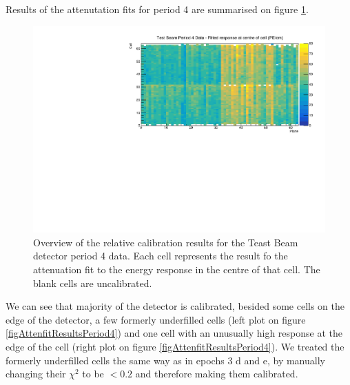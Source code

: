 \documentclass[12pt,a4paper]{article}
\begin{document}
Results of the attenutation fits for period 4 are summarised on figure \ref{figCellCentreResponsePeriod4}.

\begin{figure}[!hbtp]
\centering
\includegraphics[width=\textwidth]{Plots/CellResponseAtCentre_period4_Limited.pdf}
\caption{Overview of the relative calibration results for the Teast Beam detector period 4 data. Each cell represents the result fo the attenuation fit to the energy response in the centre of that cell. The blank cells are uncalibrated.}
\label{figCellCentreResponsePeriod4}
\end{figure}

We can see that majority of the detector is calibrated, besided some cells on the edge of the detector, a few formerly underfilled cells (left plot on figure \ref{figAttenfitResultsPeriod4}) and one cell with an unusually high response at the edge of the cell (right plot on figure \ref{figAttenfitResultsPeriod4}). We treated the formerly underfilled cells the same way as in epochs 3 d and e, by manually changing their $\chi^2$ to be $<0.2$ and therefore making them calibrated.
\end{document}
